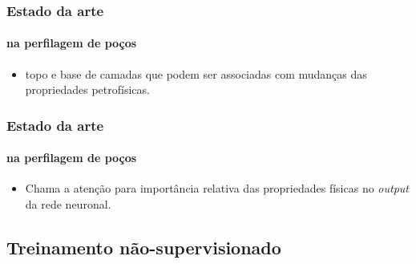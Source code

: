 \documentclass[aspectratio=10]{beamer} %
\begin{document}
\begin{frame}
\frametitle{Estado da arte}
\framesubtitle{na perfilagem de poços}
\begin{small}
\end{small}
\begin{itemize}
\item topo e base de camadas que podem ser associadas com mudanças das propriedades petrofísicas. 
\end{itemize}
\end{frame}

\begin{frame}
\frametitle{Estado da arte}
\framesubtitle{na perfilagem de poços}
\begin{small}
\end{small}
\begin{itemize}
\item Chama a atenção para importância relativa das propriedades físicas no \textit{output} da rede neuronal. 
\end{itemize}
\end{frame}


\subsection{Treinamento não-supervisionado}
\end{document}
